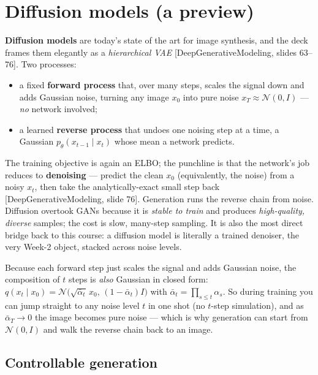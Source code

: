 \documentclass[11pt]{article}
\newcommand{\deck}[1]{\textsf{\small[#1]}}
\begin{document}
\section{Diffusion models (a preview)}

\textbf{Diffusion models} are today's state of the art for image synthesis, and
the deck frames them elegantly as a \emph{hierarchical VAE}
\deck{DeepGenerativeModeling, slides 63--76}. Two processes:
\begin{itemize}[nosep,leftmargin=*]
  \item a fixed \textbf{forward process} that, over many steps, scales the signal
  down and adds Gaussian noise, turning any image $x_0$ into pure noise $x_T\approx
  \mathcal{N}(0,I)$ --- \emph{no} network involved;
  \item a learned \textbf{reverse process} that undoes one noising step at a time,
  a Gaussian $p_\theta(x_{t-1}\mid x_t)$ whose mean a network predicts.
\end{itemize}
The training objective is again an ELBO; the punchline is that the network's job
reduces to \textbf{denoising} --- predict the clean $x_0$ (equivalently, the noise)
from a noisy $x_t$, then take the analytically-exact small step back
\deck{DeepGenerativeModeling, slide 76}. Generation runs the reverse chain from
noise. Diffusion overtook GANs because it is \emph{stable to train} and produces
\emph{high-quality, diverse} samples; the cost is slow, many-step sampling. It is
also the most direct bridge back to this course: a diffusion model is literally a
trained denoiser, the very Week-2 object, stacked across noise levels.

\begin{notebox}
Because each forward step just scales the signal and adds Gaussian noise, the
composition of $t$ steps is \emph{also} Gaussian in closed form:
$q(x_t\mid x_0)=\mathcal{N}\!\big(\sqrt{\bar\alpha_t}\,x_0,\,(1-\bar\alpha_t)I\big)$
with $\bar\alpha_t=\prod_{s\le t}\alpha_s$. So during training you can jump
straight to any noise level $t$ in one shot (no $t$-step simulation), and as
$\bar\alpha_T\to0$ the image becomes pure noise --- which is why generation can
start from $\mathcal{N}(0,I)$ and walk the reverse chain back to an image.
\end{notebox}

\subsection{Controllable generation}
\end{document}
